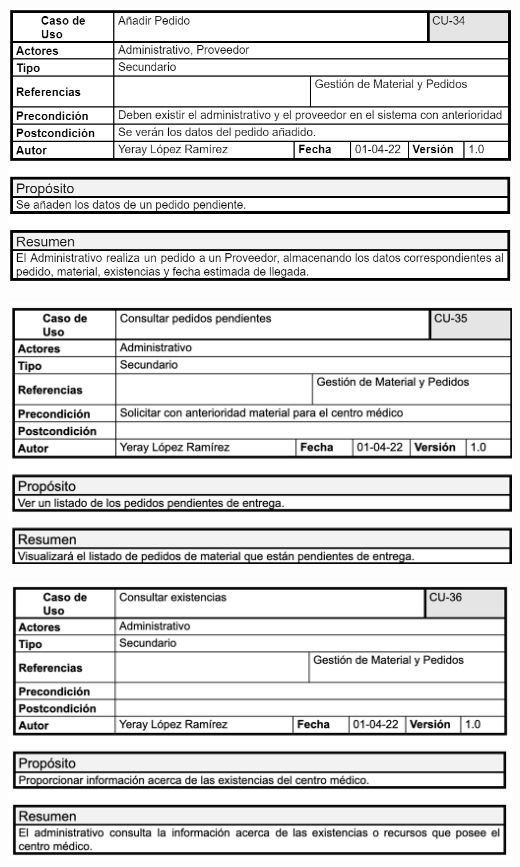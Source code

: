 \documentclass[12pt, spanish]{article}
\begin{document}
\begin{centering}\includegraphics[scale = 0.62]{casos_de_uso/34.png}\\[1.0 cm]\end{centering}
\begin{centering}\includegraphics[scale = 0.70]{casos_de_uso/35.png}\\[1.0 cm]\end{centering}
\begin{centering}\includegraphics[scale = 0.70]{casos_de_uso/36.png}\\[1.0 cm]\end{centering}
\end{document}
